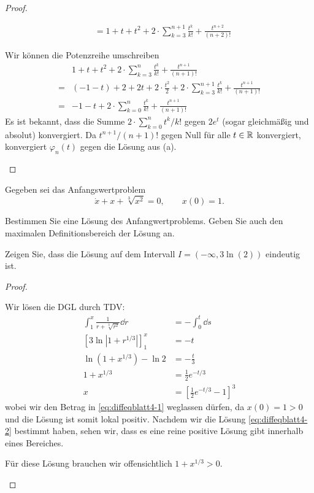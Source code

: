 \begin{proof}
\begin{parts}
\begin{align*}
			&=1+t+t^2 + 2\cdot \sum_{k=3}^{n+1}\frac{t^k}{k!}+\frac{t^{n+2}}{(n+2)!}
\end{align*}
\item Wir können die Potenzreihe umschreiben
	\begin{align*}
			&1+t+t^2 + 2\cdot \sum_{k=3}^{n}\frac{t^k}{k!}+\frac{t^{n+1}}{(n+1)!}\\
		=&(-1-t)+2+2t+2\cdot \frac{t^2}{2}+2\cdot \sum_{k=3}^{n+1}\frac{t^k}{k!}+\frac{t^{n+1}}{(n+1)!}\\
		=&-1-t+2\cdot \sum_{k=0}^n \frac{t^k}{k!}+\frac{t^{n+1}}{(n+1)!}
	\end{align*}
	Es ist bekannt, dass die Summe $2\cdot \sum_{k=0}^{n} t^k / k!$ gegen $2e^t$ (sogar gleichmäßig und absolut) konvergiert. Da $t^{n+1} / (n+1)!$ gegen Null f\"{u}r alle $t\in \mathbb{R}$ konvergiert, konvergiert $\varphi_n(t)$ gegen die L\"{o}sung aus (a).\qedhere
	\end{parts}
\end{proof}
\begin{Problem}
	Gegeben sei das Anfangswertproblem
	\[
		\dot{x}+x+\sqrt[3]{x^2} =0,\qquad x(0)=1
	.\] 
	\begin{parts}
	\item Bestimmen Sie eine L\"{o}sung des Anfangwertproblems. Geben Sie auch den maximalen Definitionsbereich der L\"{o}sung an.
	\item Zeigen Sie, dass die L\"{o}sung auf dem Intervall $I=(-\infty, 3\ln (2))$ eindeutig ist.
	\end{parts}
\end{Problem}
\begin{proof}
	\begin{parts}
	\item Wir l\"{o}sen die DGL durch TDV:
		\begin{align*}
			\int_1^x \frac{1}{r+\sqrt[3]{r^2} }\dd{r}&=-\int_0^t \dd{s}\\
			[3\ln|1+r^{1/3}|]_1^x &= -t\tag{*}\label{eq:diffeqblatt4-1}\\
			\ln (1+x^{1/3})-\ln 2 &=-\frac t3\\
			1+x^{1/3}&=\frac 12 e^{-t/3}\\
			x&=\left[ \frac{1}{2}e^{-t / 3}-1 \right]^3\tag{!}\label{eq:diffeqblatt4-2}
		\end{align*}
		wobei wir den Betrag in \eqref{eq:diffeqblatt4-1} weglassen dürfen, da $x(0)=1>0$ und die Lösung ist somit lokal positiv. Nachdem wir die Lösung \eqref{eq:diffeqblatt4-2} bestimmt haben, sehen wir, dass es eine reine positive Lösung gibt innerhalb eines Bereiches.
		
		Für diese Lösung brauchen wir offensichtlich $1+x^{1/3}>0$. 
	\end{parts}
\end{proof}
